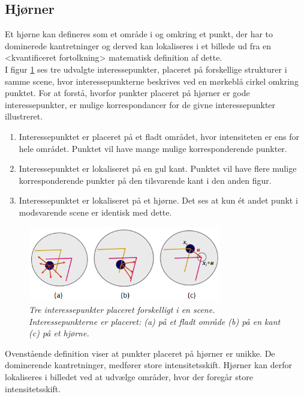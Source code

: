 \subsection*{Hjørner}\label{subsec:corner}
Et hjørne kan defineres som et område i og omkring et punkt, der har to dominerede kantretninger og derved kan lokaliseres i et billede ud fra en <kvantificeret fortolkning> matematisk definition af dette. \\ 
I figur \ref{app} ses tre udvalgte interessepunkter, placeret på forskellige strukturer i samme scene, hvor interessepunkterne beskrives ved en mørkeblå cirkel omkring punktet. For at forstå, hvorfor punkter placeret på hjørner er gode interessepunkter, er mulige korrespondancer for de givne interessepunkter illustreret.
\begin{enumerate}[label=\alph*]
\item{Interessepunktet er placeret på et fladt området, hvor intensiteten er ens for hele området. Punktet vil have mange mulige korresponderende punkter.}
\item{Interessepunktet er lokaliseret på en gul kant. Punktet vil have flere mulige korresponderende punkter på den tilsvarende kant i den anden figur.}
\item{Interessepunktet er lokaliseret på et hjørne. Det ses at kun ét andet punkt i modsvarende scene er identisk med dette.}
\end{enumerate}
\begin{figure}[H]
    \centering
    \includegraphics[width=0.75\textwidth]{fig/37.png}
    \vspace{-1em}   
    \begin{center}    
    \caption{{\footnotesize \textit{Tre interessepunkter placeret forskelligt i en scene. Interessepunkterne er placeret: (a) på et fladt område (b) på en kant (c) på et hjørne. 
 }}}
    \label{app}
     \end{center}
    \vspace{-2.7em}  
  \end{figure}  
\noindent
Ovenstående definition viser at punkter placeret på hjørner er unikke. De dominerende kantretninger, medfører store intensitetsskift. Hjørner kan derfor lokaliseres i billedet ved at udvælge områder, hvor der foregår store intensitetsskift.